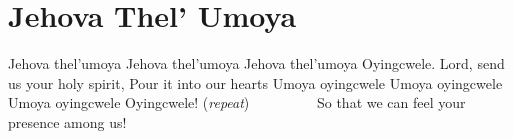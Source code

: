 \chapter{Jehova Thel' Umoya}
\starttocol
\startlines
J{\sc ehova} thel'umoya
Jehova thel'umoya
Jehova thel'umoya
Oyingcwele.
\stoplines
\nexttocol
Lord, send us your holy spirit,
Pour it into our hearts
\stoptocol
\starttocol
\startlines
Umoya oyingcwele
Umoya oyingcwele
Umoya oyingcwele
Oyingcwele!                        \hfill     ({\it repeat})~~~~~~~~~\hfill
\stoplines
\nexttocol
So that we can feel your presence among us!
\stoptocol
